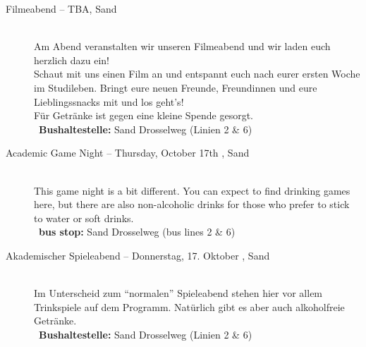 \begin{description}
\ifml
\else
    \item[Filmeabend -- TBA, Sand]~\\
    Am Abend veranstalten wir unseren Filmeabend und wir laden euch herzlich dazu ein!\\
    Schaut mit uns einen Film an und entspannt euch nach eurer ersten Woche im Studileben.
    Bringt eure neuen Freunde, Freundinnen und eure Lieblingssnacks mit und los geht's!\\
    Für Getränke ist gegen eine kleine Spende gesorgt.\\
    ~\textbf{Bushaltestelle:} Sand Drosselweg (Linien 2 \& 6)
\fi

\ifml
    \item[Academic Game Night -- Thursday, October 17th \YEAR, Sand]~\\%
    This game night is a bit different. You can expect to find drinking games here,
    but there are also non-alcoholic drinks for those who prefer to stick to water or soft drinks.\\
    ~\textbf{bus stop:} Sand Drosselweg (bus lines 2 \& 6)
\else
    \item[Akademischer Spieleabend -- Donnerstag, 17. Oktober \YEAR, Sand]~\\%
    Im Unterscheid zum "`normalen"' Spieleabend stehen hier vor allem Trinkspiele auf dem Programm.
    Natürlich gibt es aber auch alkoholfreie Getränke.\\
    ~\textbf{Bushaltestelle:} Sand Drosselweg (Linien 2 \& 6)
\fi

\ifmaster \ifbinfo \else \ifml \else \pagebreak \fi \fi \fi


\end{description}
